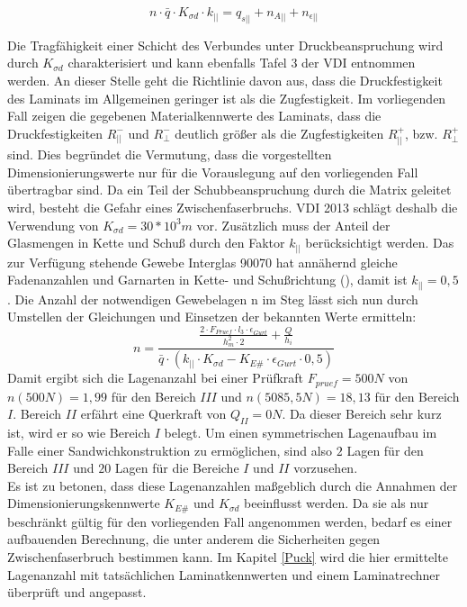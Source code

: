 \begin{equation}
	n\cdot \bar{q}\cdot K_{\sigma d}\cdot k_{||}=q_{s||}+n_{A||}+n_{\epsilon||} 
\end{equation}

\noindent Die Tragfähigkeit einer Schicht des Verbundes unter Druckbeanspruchung wird durch $ K_{\sigma d} $ charakterisiert und kann ebenfalls Tafel 3 der VDI entnommen werden. An dieser Stelle geht die Richtlinie davon aus, dass die Druckfestigkeit des Laminats im Allgemeinen geringer ist als die Zugfestigkeit. Im vorliegenden Fall zeigen die gegebenen Materialkennwerte des Laminats, dass die Druckfestigkeiten $ R_{||}^{-} $ und $ R_{\perp}^{-} $ deutlich größer als die Zugfestigkeiten $ R_{||}^{+} $, bzw. $ R_{\perp}^{+} $ sind. Dies begründet die Vermutung, dass die vorgestellten Dimensionierungswerte nur für die Vorauslegung auf den vorliegenden Fall übertragbar sind. Da ein Teil der Schubbeanspruchung durch die Matrix geleitet wird, besteht die Gefahr eines Zwischenfaserbruchs. VDI 2013 schlägt deshalb die Verwendung von $ K_{\sigma d}=30*10^{3}m $ vor. Zusätzlich muss der Anteil der Glasmengen in Kette und Schuß durch den Faktor $ k_{||} $ berücksichtigt werden. Das zur Verfügung stehende Gewebe Interglas 90070 hat annähernd gleiche Fadenanzahlen und Garnarten in Kette- und Schußrichtung (\cite{item18}), damit ist $ k_{||}=0,5 $. Die Anzahl der notwendigen Gewebelagen n im Steg lässt sich nun durch Umstellen der Gleichungen und Einsetzen der bekannten Werte ermitteln:\\

\begin{equation}
	n=\frac{\frac{2\cdot F_{Pruef}\cdot l_{3}\cdot \epsilon_{Gurt}}{h_{m}^{2}\cdot 2}+\frac{Q}{h_{i}}}{\bar{q}\cdot \left(k_{||}\cdot K_{\sigma d}-K_{E\#}\cdot \epsilon_{Gurt}\cdot 0,5\right)}
\end{equation}
Damit ergibt sich die Lagenanzahl bei einer Prüfkraft $ F_{pruef}=500N $ von $ n\left(500N\right)=1,99 $ für den Bereich $ III $ und $ n\left(5085,5N\right)=18,13 $ für den Bereich $ I $. Bereich $ II $ erfährt eine Querkraft von $Q_{II}=0N $. Da dieser Bereich sehr kurz ist, wird er so wie Bereich $ I $ belegt. Um einen symmetrischen Lagenaufbau im Falle einer Sandwichkonstruktion zu ermöglichen, sind also $ 2 $ Lagen für den Bereich $ III $ und $ 20 $ Lagen für die Bereiche $ I $ und $ II $ vorzusehen.\\

\noindent Es ist zu betonen, dass diese Lagenanzahlen maßgeblich durch die Annahmen der Dimensionierungskennwerte $ K_{E\#} $ und $ K_{\sigma d} $ beeinflusst werden. Da sie als nur beschränkt gültig für den vorliegenden Fall angenommen werden, bedarf es einer aufbauenden Berechnung, die unter anderem die Sicherheiten gegen Zwischenfaserbruch bestimmen kann. Im Kapitel \ref{Puck} wird die hier ermittelte Lagenanzahl mit tatsächlichen Laminatkennwerten und einem Laminatrechner überprüft und angepasst.

